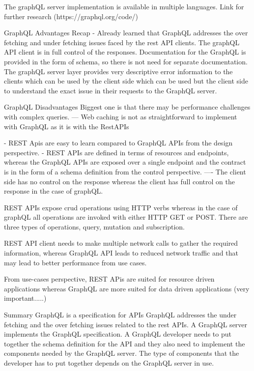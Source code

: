 \documentclass[a4paper, 11pt]{book}
\begin{document}
    The graphQL server implementation is available in multiple languages.
    Link for further research (https://graphql.org/code/)

    GraphQL Advantages
    Recap - Already learned that GraphQL addresses the over fetching and under fetching issues faced by the rest API clients.
    The graphQL API client is in full control of the responses.
    Documentation for the GraphQL is provided in the form of schema, so there is not need for separate documentation.
    The graphQL server layer provides very descriptive error information to the clients which can be used by the client side which can be used but the client side to understand the exact issue in their requests to the GraphQL server.

    GraphQL Disadvantages
    Biggest one is that there may be performance challenges with complex queries.
    --- Web caching is not as straightforward to implement with GraphQL as it is with the RestAPIs

    - REST Apis are easy to learn compared to GraphQL APIs from the design perspective.
    - REST APIs are defined in terms of resources and endpoints, whereas the GraphQL APIs are exposed over a single endpoint and the contract is in the form of a schema definition from the control perspective.
    ---- The client side has no control on the response whereas the client has full control on the response in the case of graphQL.

    REST APIs expose crud operations using HTTP verbs whereas in the case of graphQL all operations are invoked with either HTTP GET or POST.
    There are three types of operations, query, mutation and subscription.

    REST API client needs to make multiple network calls to gather the required information, whereas GraphQL API leads to reduced network traffic and that may lead to better performance from use cases.

    From use-cases perspective, REST APis are suited for resource driven applications whereas GraphQL are more suited for data driven applications (very important.....)

    Summary
    GraphQL is a specification for APIs
    GraphQL addresses the under fetching and the over fetching issues related to the rest APIs.
    A GraphQL server implements the GraphQL specification.
    A GraphQL developer needs to put together the schema definition for the API and they also need to implement the components needed by the GraphQL server.
    The type of components that the developer has to put together depends on the GraphQL server in use.
\end{document}
